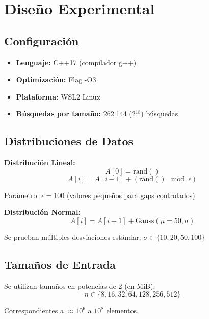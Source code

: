 \documentclass[11pt, twocolumn]{article}
\begin{document}
\section{Diseño Experimental}

\subsection{Configuración}

\begin{itemize}
    \item \textbf{Lenguaje:} C++17 (compilador g++)
    \item \textbf{Optimización:} Flag -O3
    \item \textbf{Plataforma:} WSL2 Linux
    \item \textbf{Búsquedas por tamaño:} 262.144 (2$^{18}$) búsquedas
\end{itemize}

\subsection{Distribuciones de Datos}

\textbf{Distribución Lineal:}
\begin{equation}
A[0] = \text{rand}()
\end{equation}
\begin{equation}
A[i] = A[i-1] + (\text{rand}() \mod \epsilon)
\end{equation}

Parámetro: $\epsilon = 100$ (valores pequeños para gaps controlados)

\textbf{Distribución Normal:}
\begin{equation}
A[i] = A[i-1] + \text{Gauss}(\mu=50, \sigma)
\end{equation}

Se prueban múltiples desviaciones estándar: $\sigma \in \{10, 20, 50, 100\}$

\subsection{Tamaños de Entrada}

Se utilizan tamaños en potencias de 2 (en MiB):
\begin{equation}
n \in \{8, 16, 32, 64, 128, 256, 512\}
\end{equation}

Correspondientes a $\approx 10^6$ a $10^8$ elementos.
\end{document}
